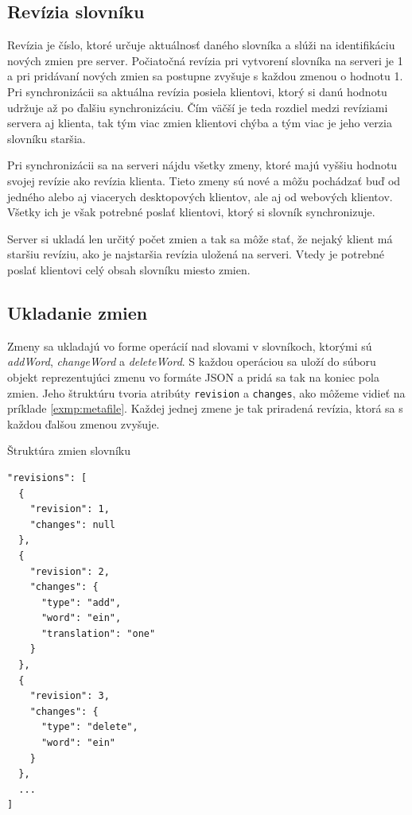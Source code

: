 \documentclass[
  digital, %
  table,   %
  lof,     %
  lot,     %
]{fithesis3}
\begin{document}
\subsection{Revízia slovníku}
Revízia je číslo, ktoré určuje aktuálnosť daného slovníka a slúži na identifikáciu nových zmien pre server. Počiatočná revízia pri vytvorení slovníka na serveri je 1 a pri pridávaní nových zmien sa postupne zvyšuje s každou zmenou o hodnotu 1. Pri synchronizácii sa aktuálna revízia posiela klientovi, ktorý si danú hodnotu udržuje až po ďalšiu synchronizáciu. Čím väčší je teda rozdiel medzi revíziami servera aj klienta, tak tým viac zmien klientovi chýba a tým viac je jeho verzia slovníku staršia.

Pri synchronizácii sa na serveri nájdu všetky zmeny, ktoré majú vyššiu hodnotu svojej revízie ako revízia klienta. Tieto zmeny sú nové a môžu pochádzať buď od jedného alebo aj viacerych desktopových klientov, ale aj od webových klientov. Všetky ich je však potrebné poslať klientovi, ktorý si slovník synchronizuje.

Server si ukladá len určitý počet zmien a tak sa môže stať, že nejaký klient má staršiu revíziu, ako je najstaršia revízia uložená na serveri. Vtedy je potrebné poslať klientovi celý obsah slovníku miesto zmien.

\subsection{Ukladanie zmien}
Zmeny sa ukladajú vo forme operácií nad slovami v slovníkoch, ktorými sú \textit{addWord}, \textit{changeWord} a \textit{deleteWord}. S každou operáciou sa uloží do súboru objekt reprezentujúci zmenu vo formáte JSON a pridá sa tak na koniec pola zmien. Jeho štruktúru tvoria atribúty \texttt{revision} a \texttt{changes}, ako môžeme vidieť na príklade \ref{exmp:metafile}. Každej jednej zmene je tak priradená revízia, ktorá sa s každou ďalšou zmenou zvyšuje.

\begin{exmp}
\label{exmp:metafile}
Štruktúra zmien slovníku
\centering
\begin{lstlisting}[basicstyle=\small]
"revisions": [
  {
    "revision": 1,
    "changes": null
  },
  {
    "revision": 2,
    "changes": {
      "type": "add",
      "word": "ein",
      "translation": "one"
    }
  },
  {
    "revision": 3,
    "changes": {
      "type": "delete",
      "word": "ein"
    }
  },
  ...
]
\end{lstlisting}
\end{exmp}
\end{document}
